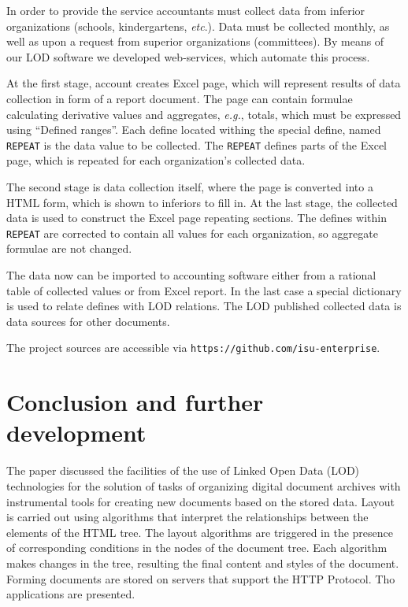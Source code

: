 \documentclass[conference,a4paper]{IEEEtran}
\providecommand\url[1]{\texttt{#1}}
\begin{document}
In order to provide the service accountants must collect data from inferior organizations (schools, kindergartens, \textit{etc}.).  Data must be collected monthly, as well as upon a request from superior organizations (committees).  By means of our LOD software we developed web-services, which automate this process.

At the first stage, account creates Excel page, which will represent results of data collection in form of a report document.  The page can contain formulae calculating derivative values and aggregates, \textit{e.g.}, totals, which must be expressed using ``Defined ranges''.  Each define located withing the special define, named \texttt{REPEAT} is the data value to be collected.  The \texttt{REPEAT} defines parts of the Excel page, which is repeated for each organization's collected data.

The second stage is data collection itself, where the page is converted into a HTML form, which is shown to inferiors to fill in.  At the last stage, the collected data is used to construct the Excel page repeating sections.  The defines within \texttt{REPEAT} are corrected to contain all values for each organization, so aggregate formulae are not changed.

The data now can be imported to accounting software either from a rational table of collected values or from Excel report.  In the last case a special dictionary is used to relate defines with LOD relations.  The LOD published collected data is data sources for other documents.

The project sources are accessible via \url{https://github.com/isu-enterprise}.

\section{Conclusion and further development}
\label{sec:conc}

The paper discussed the facilities of the use of Linked Open Data (LOD) technologies for the solution of tasks of organizing digital document archives with instrumental tools for creating new documents based on the stored data.  Layout is carried out using algorithms that interpret the relationships between the elements of the HTML tree.  The layout algorithms are triggered in the presence of corresponding conditions in the nodes of the document tree. Each algorithm makes changes in the tree, resulting the final content and styles of the document. Forming documents are stored on servers that support the HTTP Protocol.  Tho applications are presented.
\end{document}
